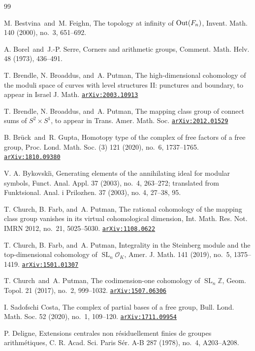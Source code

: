 \documentclass[11pt]{amsart}
\newcommand{\arxiv}[1]{\href{http://arxiv.org/abs/#1}{{\tt arXiv:#1}}}
\numberwithin{equation}{section}
\theoremstyle{plain}
\theoremstyle{definition}
\theoremstyle{remark}
\DeclareMathOperator{\SL}{SL}
\newcommand\Z{\ensuremath{\mathbb{Z}}}
\newcommand\cO{\ensuremath{\mathcal{O}}}
\begin{document}
\begin{thebibliography}{99}

M. Bestvina\ and\ M. Feighn, The topology at infinity of ${\rm Out}(F_n)$, Invent. Math. 140 (2000), no.~3, 651--692. 

A. Borel\ and\ J.-P. Serre, Corners and arithmetic groups, Comment. Math. Helv. 48 (1973), 436--491.

T. Brendle, N. Broaddus, and\ A. Putman, The high-dimensional cohomology of the moduli space of curves with level structures II: punctures and boundary, to appear in Israel J. Math. \arxiv{2003.10913} 

T. Brendle, N. Broaddus, and\ A. Putman, The mapping class group of connect sums of $S^2 \times S^1$, to appear in Trans. Amer. Math. Soc. \arxiv{2012.01529}

B. Br\"{u}ck\ and\ R. Gupta, Homotopy type of the complex of free factors of a free group, Proc. Lond. Math. Soc. (3) 121 (2020), no.~6, 1737--1765. \arxiv{1810.09380}

V. A. Bykovski\u{\i}, Generating elements of the annihilating ideal for modular symbols, Funct. Anal. Appl. 37 (2003), no.~4, 263--272; translated from Funktsional. Anal. i Prilozhen. 37 (2003), no. 4, 27--38, 95.

T. Church, B. Farb, and\ A. Putman, The rational cohomology of the mapping class group vanishes in its virtual cohomological dimension, Int. Math. Res. Not. IMRN 2012, no.~21, 5025--5030. \arxiv{1108.0622}

T. Church, B. Farb, and\ A. Putman, Integrality in the Steinberg module and the top-dimensional cohomology of $\SL_n \cO_K$, Amer. J. Math. 141 (2019), no.~5, 1375--1419. \arxiv{1501.01307}

T. Church\ and\ A. Putman, The codimension-one cohomology of $\SL_n \Z$, Geom. Topol. 21 (2017), no.~2, 999--1032. \arxiv{1507.06306}

I. Sadofschi Costa, The complex of partial bases of a free group, Bull. Lond. Math. Soc. 52 (2020), no.~1, 109--120. \arxiv{1711.09954}

P. Deligne, Extensions centrales non r\'{e}siduellement finies de groupes arithm\'{e}tiques, C. R. Acad. Sci. Paris S\'{e}r. A-B 287 (1978), no.~4, {\rm A}203--{\rm A}208.


\end{thebibliography}
\end{document}
